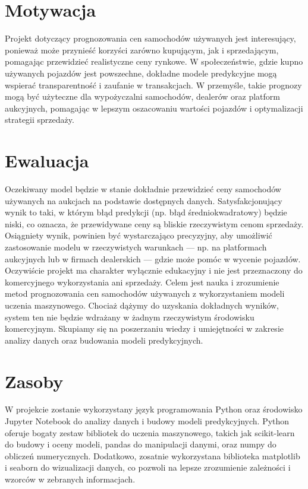 \documentclass[10pt,letterpaper]{article}
\begin{document}
\section{Motywacja}
Projekt dotyczący prognozowania cen samochodów używanych jest interesujący, ponieważ może przynieść korzyści zarówno kupującym, jak i sprzedającym, pomagając przewidzieć realistyczne ceny rynkowe. W społeczeństwie, gdzie kupno używanych pojazdów jest powszechne, dokładne modele predykcyjne mogą wspierać transparentność i zaufanie w transakcjach. W przemyśle, takie prognozy mogą być użyteczne dla wypożyczalni samochodów, dealerów oraz platform aukcyjnych, pomagając w lepszym oszacowaniu wartości pojazdów i optymalizacji strategii sprzedaży.

\section{Ewaluacja}
Oczekiwany model będzie w stanie dokładnie przewidzieć ceny samochodów używanych na aukcjach na podstawie dostępnych danych. Satysfakcjonujący wynik to taki, w którym błąd predykcji (np. błąd średniokwadratowy) będzie niski, co oznacza, że przewidywane ceny są bliskie rzeczywistym cenom sprzedaży. Osiągniety wynik, powinien być wystarczająco precyzyjny, aby umożliwić zastosowanie modelu w rzeczywistych warunkach — np. na platformach aukcyjnych lub w firmach dealerskich — gdzie może pomóc w wycenie pojazdów. Oczywiście projekt ma charakter wyłącznie edukacyjny i nie jest przeznaczony do komercyjnego wykorzystania ani sprzedaży. Celem jest nauka i zrozumienie metod prognozowania cen samochodów używanych z wykorzystaniem modeli uczenia maszynowego. Chociaż dążymy do uzyskania dokładnych wyników, system ten nie będzie wdrażany w żadnym rzeczywistym środowisku komercyjnym. Skupiamy się na poszerzaniu wiedzy i umiejętności w zakresie analizy danych oraz budowania modeli predykcyjnych.

\section{Zasoby}
W projekcie zostanie wykorzystany język programowania Python oraz środowisko Jupyter Notebook do analizy danych i budowy modeli predykcyjnych. Python oferuje bogaty zestaw bibliotek do uczenia maszynowego, takich jak scikit-learn do budowy i oceny modeli, pandas do manipulacji danymi, oraz numpy do obliczeń numerycznych. Dodatkowo, zosatnie wykorzystana biblioteka matplotlib i seaborn do wizualizacji danych, co pozwoli na lepsze zrozumienie zależności i wzorców w zebranych informacjach.
\end{document}
